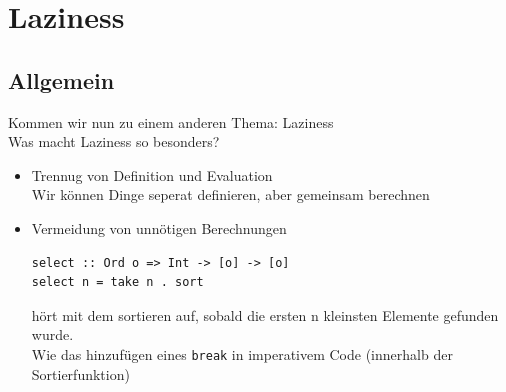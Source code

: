 \documentclass{beamer}
\begin{document}
\section{Laziness}

\subsection{Allgemein}

\begin{frame}[fragile]
Kommen wir nun zu einem anderen Thema: Laziness\\\pause\bigskip
Was macht Laziness so besonders?\pause
\begin{itemize}
 \item Trennug von Definition und Evaluation\\\pause
       Wir können Dinge seperat definieren, aber gemeinsam berechnen
 \pause
 \item Vermeidung von unnötigen Berechnungen\\\pause
\begin{verbatim}
select :: Ord o => Int -> [o] -> [o]
select n = take n . sort
\end{verbatim}
       \pause
       hört mit dem sortieren auf, sobald die ersten n kleinsten Elemente gefunden wurde.\\\pause
       Wie das hinzufügen eines \texttt{break} in imperativem Code (innerhalb der Sortierfunktion)
\end{itemize}
\end{frame}
\end{document}
